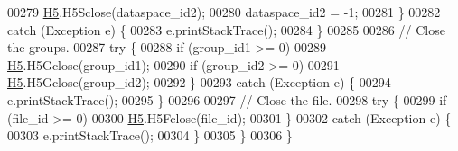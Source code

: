 \begin{DoxyCode}
00279                 \hyperlink{namespace_h5}{H5}.H5Sclose(dataspace\_id2);
00280             dataspace\_id2 = -1;
00281         \}
00282         \textcolor{keywordflow}{catch} (Exception e) \{
00283             e.printStackTrace();
00284         \}
00285 
00286         \textcolor{comment}{// Close the groups.}
00287         \textcolor{keywordflow}{try} \{
00288             \textcolor{keywordflow}{if} (group\_id1 >= 0)
00289                 \hyperlink{namespace_h5}{H5}.H5Gclose(group\_id1);
00290             \textcolor{keywordflow}{if} (group\_id2 >= 0)
00291                 \hyperlink{namespace_h5}{H5}.H5Gclose(group\_id2);
00292         \}
00293         \textcolor{keywordflow}{catch} (Exception e) \{
00294             e.printStackTrace();
00295         \}
00296 
00297         \textcolor{comment}{// Close the file.}
00298         \textcolor{keywordflow}{try} \{
00299             \textcolor{keywordflow}{if} (file\_id >= 0)
00300                 \hyperlink{namespace_h5}{H5}.H5Fclose(file\_id);
00301         \}
00302         \textcolor{keywordflow}{catch} (Exception e) \{
00303             e.printStackTrace();
00304         \}
00305     \}
00306 \}
\end{DoxyCode}
